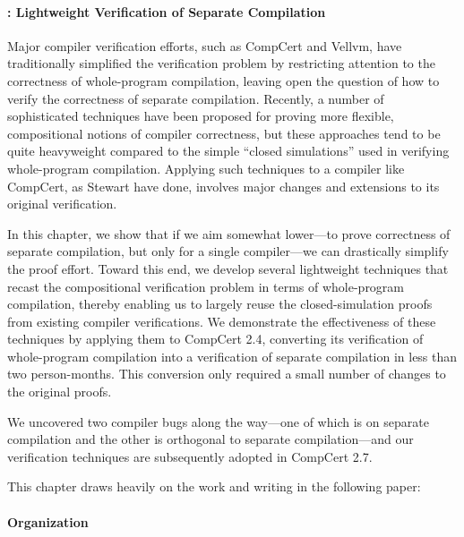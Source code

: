 \paragraph{: Lightweight Verification of Separate Compilation}

Major compiler verification efforts, such as CompCert and Vellvm, have traditionally simplified the
verification problem by restricting attention to the correctness of whole-program compilation,
leaving open the question of how to verify the correctness of separate compilation.  Recently, a
number of sophisticated techniques have been proposed for proving more flexible, compositional
notions of compiler correctness, but these approaches tend to be quite heavyweight compared to the
simple ``closed simulations'' used in verifying whole-program compilation.  Applying such techniques
to a compiler like CompCert, as Stewart \etal{} have done, involves major changes and extensions to
its original verification.

In this chapter, we show that if we aim somewhat lower---to prove correctness of separate
compilation, but only for a single compiler---we can drastically simplify the proof effort.  Toward
this end, we develop several lightweight techniques that recast the compositional verification
problem in terms of whole-program compilation, thereby enabling us to largely reuse the
closed-simulation proofs from existing compiler verifications.  We demonstrate the effectiveness of
these techniques by applying them to CompCert 2.4, converting its verification of whole-program
compilation into a verification of separate compilation in less than two person-months.  This
conversion only required a small number of changes to the original proofs.

We uncovered two compiler bugs along the way---one of which is on separate compilation and the other
is orthogonal to separate compilation---and our verification techniques are subsequently adopted in
CompCert 2.7.

This chapter draws heavily on the work and writing in the following paper:


\paragraph{Organization}

